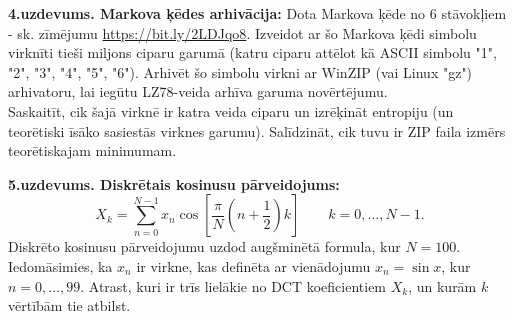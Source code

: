 \documentclass[11pt]{article}
\begin{document}
\vspace{6pt}
{\bf 4.uzdevums. Markova ķēdes arhivācija:} 
Dota Markova ķēde no $6$ stāvokļiem - sk. zīmējumu 
\url{https://bit.ly/2LDJqo8}. 
Izveidot ar šo Markova ķēdi simbolu virknīti tieši miljons ciparu garumā
(katru ciparu attēlot kā ASCII simbolu "1", "2", "3", "4", "5", "6"). 
Arhivēt šo simbolu virkni ar WinZIP (vai Linux "gz") arhivatoru, lai iegūtu 
LZ78-veida arhīva garuma novērtējumu.\\
Saskaitīt, cik šajā virknē ir katra veida ciparu un izrēķināt entropiju (un 
teorētiski īsāko sasiestās virknes garumu). Salīdzināt, cik tuvu ir ZIP 
faila izmērs teorētiskajam minimumam. 


\vspace{6pt}
{\bf 5.uzdevums. Diskrētais kosinusu pārveidojums:} 
$$X_k = \sum_{n=0}^{N-1} x_n \cos \left[\frac{\pi}{N} \left(n+\frac{1}{2}\right) k \right] \quad \quad k = 0, \dots, N-1.$$
Diskrēto kosinusu pārveidojumu uzdod augšminētā formula, kur $N=100$. 
Iedomāsimies, ka $x_n$ ir virkne, kas definēta ar vienādojumu $x_n = \sin x$, kur $n=0,\ldots,99$. 
Atrast, kuri ir trīs lielākie no DCT koeficientiem $X_k$, un kurām $k$ vērtībām tie atbilst.
\end{document}
